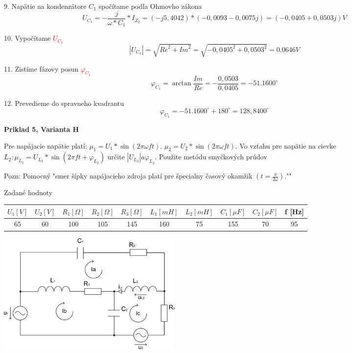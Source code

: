 \documentclass[a4paper,12pt]{article}
\begin{document}
9. Napätie na kondenzátore $C_1$ spočítame podľa Ohmovho zákona
\begin{equation*}
U_{C_1} = -\frac{j}{\omega*C_1}* I_{Z_2} = (-j5,4042) * (-0,0093 - 0,0075j) = (-0,0405 + 0,0503j) V
\end{equation*}

10. Vypočítame  \textcolor{red}{$U_{C_1}$}
\begin{equation*}
|U_{C_1}| = \sqrt{{Re}^2 + {Im}^2} = \sqrt{-0,0405^2 + 0,0503^2} = 0.0646 V
\end{equation*}

11. Zistíme fázovy posun \textcolor{red}{$\varphi_{C_1}$}
\begin{equation*}
\varphi_{C_1} = \arctan \frac{Im}{Re} = -\frac{0,0503}{0,0405} = -51.1600^{\circ}
\end{equation*}

12. Prevedieme do spravneho kvadrantu
\begin{equation*}
\varphi_{C_1} = -51.1600^{\circ} + 180^{\circ} = 128,8400^{\circ}
\end{equation*}

\newpage
\begin{center}
\textbf{Priklad 5, Varianta H}
\end{center}
\bigskip
Pre napájacie napätie platí: $\mu_1 = U_1 * \sin (2\pi\omega ft)$. $\mu_2 = U_2 * \sin (2\pi\omega ft)$. Vo vzťahu pre napätie na cievke $L_2: \mu_{L_2} = U_{L_2} * \sin (2\pi ft + \varphi_{L_2})$ určite $|U_{L_2}| a \varphi_{L_2}$.
Použite metódu smyčkových prúdov

Pozn: Pomocný "smer šípky napájacieho zdroja platí pre špecialny časový okamžik $(t = \frac{\pi}{2\omega})$.""
\bigskip

Zadané hodnoty

\begin{tabular} {|  c | c | c |  c | c | c | c | c | c | c | }
\hline
$U_1 [V]$ & $U_2 [V]$ &  $R_1 [\Omega]$  & $R_2 [\Omega]$  &$R_3 [\Omega]$  & $L_1 [mH]$ & $L_2 [mH]$ & $C_1[\mu F]$ & $C_2[\mu F]$  & f [Hz] \\ \hline
65 & 60 & 100 & 105 & 145 & 160 & 75 & 155 & 70 & 95\\ \hline
\end{tabular}
\bigskip

\includegraphics[height=6cm]{img/pr5}
\end{document}

